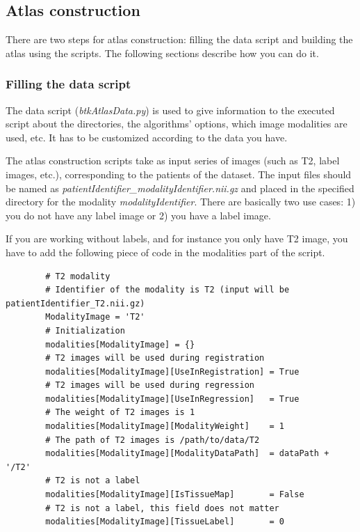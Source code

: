 \subsection{Atlas construction}
\label{subsec:atlas}

    There are two steps for atlas construction: filling the data script and building the atlas using the scripts. The following sections describe how you can do it.

    \subsubsection*{Filling the data script}
    
    The data script (\emph{btkAtlasData.py}) is used to give information to the executed script about the directories, the algorithms' options, which image modalities are used, etc. It has to be customized according to the data you have.
    
    The atlas construction scripts take as input series of images (such as T2, label images, etc.), corresponding to the patients of the dataset. The input files should be named as \emph{patientIdentifier\_modalityIden\-tifier.nii.gz} and placed in the specified directory for the modality \emph{modalityIdentifier}. There are basically two use cases: 1) you do not have any label image or 2) you have a label image.

    If you are working without labels, and for instance you only have T2 image, you have to add the following piece of code in the modalities part of the script.
    \begin{verbatim}
        # T2 modality
        # Identifier of the modality is T2 (input will be patientIdentifier_T2.nii.gz)
        ModalityImage = 'T2'
        # Initialization
        modalities[ModalityImage] = {}
        # T2 images will be used during registration
        modalities[ModalityImage][UseInRegistration] = True
        # T2 images will be used during regression
        modalities[ModalityImage][UseInRegression]   = True
        # The weight of T2 images is 1
        modalities[ModalityImage][ModalityWeight]    = 1
        # The path of T2 images is /path/to/data/T2
        modalities[ModalityImage][ModalityDataPath]  = dataPath + '/T2'
        # T2 is not a label
        modalities[ModalityImage][IsTissueMap]       = False
        # T2 is not a label, this field does not matter
        modalities[ModalityImage][TissueLabel]       = 0
    \end{verbatim}


